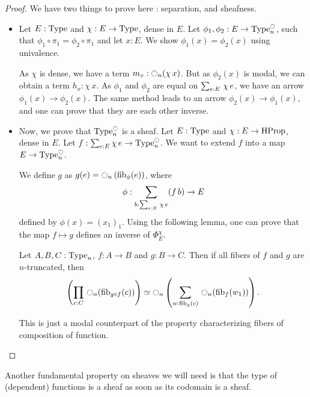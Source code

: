 \begin{proof}
  We have two things to prove here : separation, and sheafness.
  \begin{itemize}
  \item Let $E:\operatorname{Type}$ and $\chi:E\to\operatorname{Type}$, dense in $E$. 
    Let $\phi_1,\phi_2:E \to
    \operatorname{Type}_n^{\ocircle}$, such that $\phi_1 \circ \pi_1 = \phi_2 \circ
    \pi_1$ and let $x:E$. We show $\phi_1(x) = \phi_2(x)$ using
    univalence.
    
    As $\chi$ is dense, we have a term $m_x : \ocircle_n(\chi\, x)$.
    But as $\phi_2(x)$ is modal, we can obtain a term $h_x : \chi\,
    x$. 
    As $\phi_1$ and $\phi_2$ are equal on $\sum_{e:E}\, \chi\, e$, we
    have an arrow $\phi_1(x) \to \phi_2(x)$.
    The same method leads to an arrow $\phi_2 (x) \to \phi_1 (x)$, and
    one can
    prove that they are each other inverse.
  \item Now, we prove that $\operatorname{Type}_n^{\ocircle}$ is a sheaf. Let $E:\operatorname{Type}$ and
  $\chi:E \to \operatorname{HProp}$, dense in $E$. Let $f:\sum_{e:E} \chi\, e \to
  \operatorname{Type}_n^{\ocircle}$. We want to extend $f$ into a map $E \to \operatorname{Type}_n^{\ocircle}$.

  We define $g$ as $g(e) = \ocircle_n \left( \mathrm{fib}_{\phi}(e) \right)$,
  where
  \[ \phi : \sum_{b:\sum_{e:E}\, \chi\, e} (f\,
    b) \to E\]
  defined by $\phi(x) = (x_1)_1$.
  Using the following lemma, one can prove that the map $f\mapsto g$
  defines an inverse of $\Phi_E^\chi$.
  \begin{lem}
    Let $A,B,C:\operatorname{Type}_n$, $f:A\to B$ and $g:B\to C$.
    Then
    if all fibers of $f$ and $g$ are $n$-truncated, then
      \[\left( \prod_{c:C}\, \ocircle_n(\mathrm{fib}_{g \circ f}(c))\right) \simeq
      \ocircle_n \left(  
        \sum_{w:\mathrm{fib}_{g}(c)}\, \ocircle_n (\mathrm{fib}_{f}(w_1))
      \right).\]
  \end{lem}
  \begin{prooflem}
    This is just a modal counterpart of the property characterizing
    fibers of composition of function.
  \end{prooflem}
  \end{itemize}
\end{proof}

Another fundamental property on sheaves we will need is that the type of (dependent)
functions is a sheaf as soon as its codomain is a sheaf.

